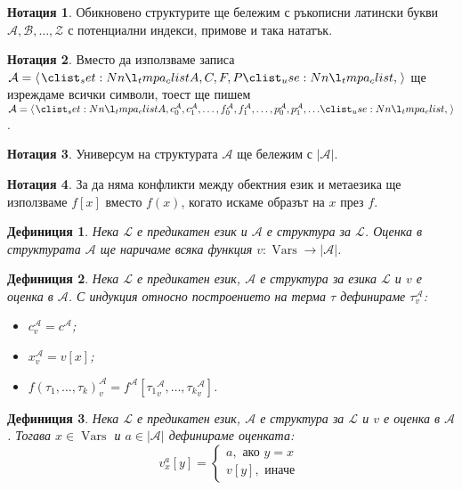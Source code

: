 \documentclass[12pt]{article}
\newcommand{\vars}{\operatorname{Vars}}
\newcommand{\calA}{\mathcal{A}}
\newcommand{\calL}{\mathcal{L}}
\newcommand{\calZ}{\mathcal{Z}}
\newcommand{\calB}{\mathcal{B}}
\newtheorem*{definition}{Дефиниция}
\theoremstyle{definition}
\newtheorem*{notation}{Нотация}
\begin{document}
\begin{notation}
    Обикновено структурите ще бележим с ръкописни латински букви $\calA, \calB, \dots, \calZ$ с потенциални индекси, примове и така нататък.
\end{notation}

\begin{notation}
    Вместо да използваме записа $\calA = \opair{A, C, F, P}$ ще изреждаме всички символи, тоест ще пишем $\calA = \opair{A, c_0^\calA, c_1^\calA, \dots, f_0^\calA, f_1^\calA, \dots, p_0^\calA, p_1^\calA, \dots}$.
\end{notation}

\begin{notation}
    Универсум на структурата $\calA$ ще бележим с $|\calA|$.
\end{notation}

\begin{notation}
    За да няма конфликти между обектния език и метаезика ще използваме $f[x]$ вместо $f(x)$, когато искаме образът на $x$ през $f$.
\end{notation}

\begin{definition}
    Нека $\calL$ е предикатен език и $\calA$ е структура за $\calL$.
    Оценка в структурата $\calA$ ще наричаме всяка функция $v : \vars \rightarrow |\calA|$.
\end{definition}

\begin{definition}
    Нека $\calL$ е предикатен език, $\calA$ е структура за езика $\calL$ и $v$ е оценка в $\calA$.
    С индукция относно построението на терма $\tau$ дефинираме $\tau_v^\calA$:
    \begin{itemize}
        \item $c_v^\calA = c^\calA$;
        \item $x_v^\calA = v[x]$;
      \item $f(\tau_1, \dots, \tau_k)_v^\calA = f^\calA[{\tau_1}_v^\calA, \dots, {\tau_k}_v^\calA]$.
    \end{itemize}
\end{definition}

\begin{definition}
    Нека $\calL$ е предикатен език, $\calA$ е структура за $\calL$ и $v$ е оценка в $\calA$.
    Тогава $x \in \vars$ и $a \in |\calA|$ дефинираме оценката:
    \[
      v_x^a[y] =
      \begin{cases}
        a, \text{ ако } y = x \\
        v[y], \text{ иначе }
      \end{cases}
    \]
\end{definition}
\end{document}
